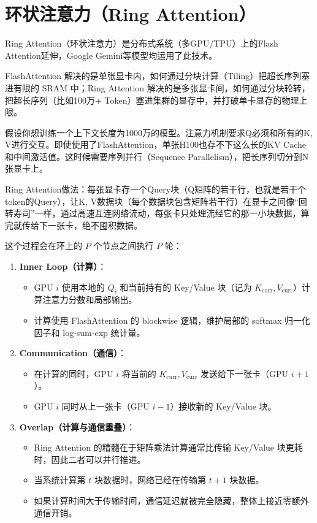 \hypertarget{ux73afux72b6ux6ce8ux610fux529bring-attention}{%
\section{环状注意力（Ring Attention）}\label{ux73afux72b6ux6ce8ux610fux529bring-attention}}

Ring Attention（环状注意力）是分布式系统（多GPU/TPU）上的Flash Attention延伸，Google Gemini等模型均运用了此技术。

FlashAttention 解决的是单张显卡内，如何通过分块计算（Tiling）把超长序列塞进有限的 SRAM 中；Ring Attention 解决的是多张显卡间，如何通过分块轮转，把超长序列（比如100万+ Token）塞进集群的显存中，并打破单卡显存的物理上限。

假设你想训练一个上下文长度为1000万的模型。注意力机制要求Q必须和所有的K, V进行交互。即使使用了FlashAttention，单张H100也存不下这么长的KV Cache和中间激活值。这时候需要序列并行（Sequence Parallelism），把长序列切分到N张显卡上。

Ring Attention做法：每张显卡存一个Query块（Q矩阵的若干行，也就是若干个token的Query），让K, V数据块（每个数据块包含矩阵若干行）在显卡之间像``回转寿司''一样，通过高速互连网络流动，每张卡只处理流经它的那一小块数据，算完就传给下一张卡，绝不囤积数据。

这个过程会在环上的 \(P\) 个节点之间执行 \(P\) 轮：

\begin{enumerate}
\def\labelenumi{\arabic{enumi}.}
\tightlist
\item
  \textbf{Inner Loop（计算）}：

  \begin{itemize}
  \tightlist
  \item
    GPU \(i\) 使用本地的 \(Q_i\) 和当前持有的 Key/Value 块（记为 \(K_{\mathrm{curr}}, V_{\mathrm{curr}}\)）计算注意力分数和局部输出。
  \item
    计算使用 FlashAttention 的 blockwise 逻辑，维护局部的 softmax 归一化因子和 log-sum-exp 统计量。
  \end{itemize}
\item
  \textbf{Communication（通信）}：

  \begin{itemize}
  \tightlist
  \item
    在计算的同时，GPU \(i\) 将当前的 \(K_{\mathrm{curr}}, V_{\mathrm{curr}}\) 发送给下一张卡（GPU \(i+1\)）。
  \item
    GPU \(i\) 同时从上一张卡（GPU \(i-1\)）接收新的 Key/Value 块。
  \end{itemize}
\item
  \textbf{Overlap（计算与通信重叠）}：

  \begin{itemize}
  \tightlist
  \item
    Ring Attention 的精髓在于矩阵乘法计算通常比传输 Key/Value 块更耗时，因此二者可以并行推进。
  \item
    当系统计算第 \(t\) 块数据时，网络已经在传输第 \(t+1\) 块数据。
  \item
    如果计算时间大于传输时间，通信延迟就被完全隐藏，整体上接近零额外通信开销。
  \end{itemize}
\end{enumerate}

